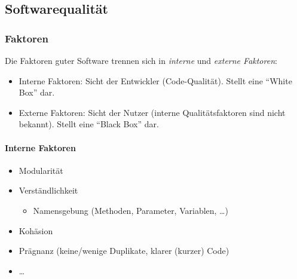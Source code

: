 \documentclass[ngerman,color=3b]{tuda_summary}
\begin{document}
\subsection{Softwarequalität}
\subsubsection{Faktoren}
Die Faktoren guter Software trennen sich in \textit{interne} und \textit{externe Faktoren}:
\begin{itemize}
    \item Interne Faktoren: Sicht der Entwickler (Code-Qualität). Stellt eine \enquote{White Box} dar.
    \item Externe Faktoren: Sicht der Nutzer (interne Qualitätsfaktoren sind nicht bekannt). Stellt eine \enquote{Black Box} dar.
\end{itemize}
\paragraph{Interne Faktoren}
\begin{itemize}
    \item Modularität
    \item Verständlichkeit
          \begin{itemize}
              \item Namensgebung (Methoden, Parameter, Variablen, \dots)
          \end{itemize}
    \item Kohäsion
    \item Prägnanz (keine/wenige Duplikate, klarer (kurzer) Code)
    \item \dots
\end{itemize}
\end{document}
